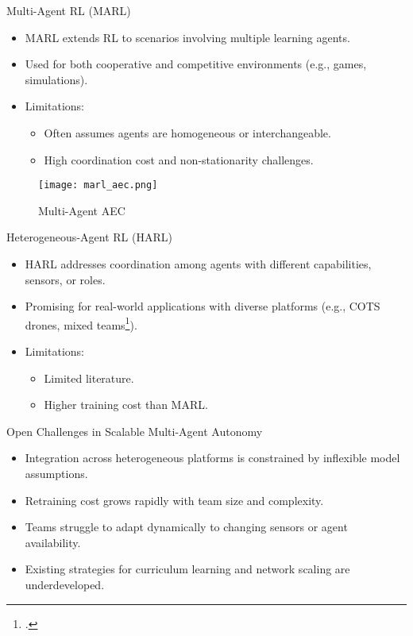 \documentclass[xcolor={svgnames},aspectratio=169]{beamer}
\begin{document}
\begin{frame}{Multi-Agent RL (MARL)}
    \begin{itemize}
        \item MARL extends RL to scenarios involving multiple learning agents.
        \item Used for both cooperative and competitive environments (e.g., games, simulations).
        \item Limitations:
        \begin{itemize}
            \item Often assumes agents are homogeneous or interchangeable.
            \item High coordination cost and non-stationarity challenges.
        \end{itemize}
    \end{itemize}
    \begin{figure}[!h]
        \centering
        \texttt{[image: marl\_aec.png]}
        \caption{Multi-Agent AEC}
        \label{fig:marl_aec}
    \end{figure}
\end{frame}

\begin{frame}{Heterogeneous-Agent RL (HARL)}
    \begin{itemize}
        \item HARL addresses coordination among agents with different 
            capabilities, sensors, or roles.
        \item Promising for real-world applications with diverse platforms 
            (e.g., COTS drones, mixed teams\footcite{guo2024}).
        \item Limitations:
        \begin{itemize}
            \item Limited literature.
            \item Higher training cost than MARL.
        \end{itemize}
    \end{itemize}
\end{frame}

\begin{frame}{Open Challenges in Scalable Multi-Agent Autonomy}
    \begin{itemize}
        \item Integration across heterogeneous platforms is constrained by inflexible model assumptions.
        \item Retraining cost grows rapidly with team size and complexity.
        \item Teams struggle to adapt dynamically to changing sensors or agent availability.
        \item Existing strategies for curriculum learning and network scaling are underdeveloped.
    \end{itemize}
\end{frame}
\end{document}
